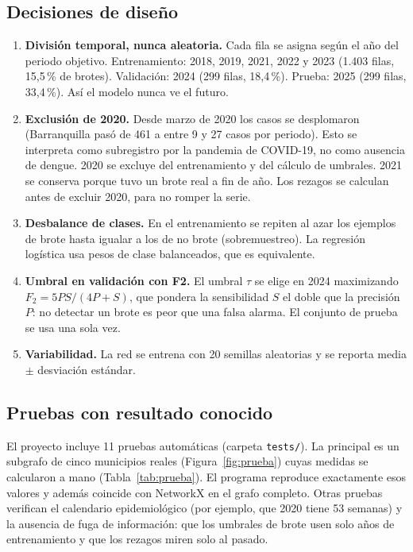 \documentclass[11pt,letterpaper]{article}
\begin{document}
\subsection{Decisiones de diseño}\label{sec:decisiones}
\begin{enumerate}[label=\alph*)]
  \item \textbf{División temporal, nunca aleatoria.} Cada fila se asigna según el año del periodo objetivo. Entrenamiento: 2018, 2019, 2021, 2022 y 2023 (1.403 filas, 15,5\,\% de brotes). Validación: 2024 (299 filas, 18,4\,\%). Prueba: 2025 (299 filas, 33,4\,\%). Así el modelo nunca ve el futuro.
  \item \textbf{Exclusión de 2020.} Desde marzo de 2020 los casos se desplomaron (Barranquilla pasó de 461 a entre 9 y 27 casos por periodo). Esto se interpreta como subregistro por la pandemia de COVID-19, no como ausencia de dengue. 2020 se excluye del entrenamiento y del cálculo de umbrales. 2021 se conserva porque tuvo un brote real a fin de año. Los rezagos se calculan antes de excluir 2020, para no romper la serie.
  \item \textbf{Desbalance de clases.} En el entrenamiento se repiten al azar los ejemplos de brote hasta igualar a los de no brote (sobremuestreo). La regresión logística usa pesos de clase balanceados, que es equivalente.
  \item \textbf{Umbral en validación con F2.} El umbral $\tau$ se elige en 2024 maximizando $F_2 = 5PS/(4P+S)$, que pondera la sensibilidad $S$ el doble que la precisión $P$: no detectar un brote es peor que una falsa alarma. El conjunto de prueba se usa una sola vez.
  \item \textbf{Variabilidad.} La red se entrena con 20 semillas aleatorias y se reporta media $\pm$ desviación estándar.
\end{enumerate}

\subsection{Pruebas con resultado conocido}
El proyecto incluye 11 pruebas automáticas (carpeta \texttt{tests/}). La principal es un subgrafo de cinco municipios reales (Figura~\ref{fig:prueba}) cuyas medidas se calcularon a mano (Tabla~\ref{tab:prueba}). El programa reproduce exactamente esos valores y además coincide con NetworkX \citep{hagberg2008} en el grafo completo. Otras pruebas verifican el calendario epidemiológico (por ejemplo, que 2020 tiene 53 semanas) y la ausencia de fuga de información: que los umbrales de brote usen solo años de entrenamiento y que los rezagos miren solo al pasado.
\end{document}
